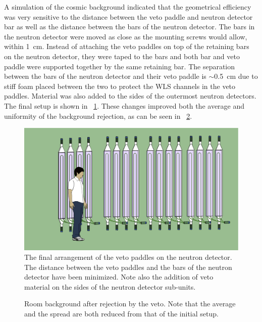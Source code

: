 A simulation of the cosmic background indicated that the geometrical efficiency was very sensitive to the distance between the veto paddle and neutron detector bar as well as the distance between the bars of the neutron detector.   The bars in the neutron detector were moved as close as the mounting screws would allow, within 1~cm.  Instead of attaching the veto paddles on top of the retaining bars on the neutron detector, they were taped to the bars and both bar and veto paddle were supported together by the same retaining bar.  The separation between the bars of the neutron detector and their veto paddle is $\sim$0.5~cm due to stiff foam placed between the two to protect the WLS channels in the veto paddles.  Material was also added to the sides of the outermost neutron detectors.  The final setup is shown in {\fig}~\ref{fig:vetoSetup}.  These changes improved both the average and uniformity of the background rejection, as can be seen in {\fig}~\ref{fig:finalBackground}.
\begin{figure}[htp]
\centering
\includegraphics[width=1.0\textwidth]{figures/neutwall_Oct18.eps}
\caption{The final arrangement of the veto paddles on the neutron detector.  The distance between the veto paddles and the bars of the neutron detector have been minimized.  Note also the addition of veto material on the sides of the neutron detector sub-units.}
\label{fig:vetoSetup}
\end{figure}

\begin{figure}[htp]
\vspace{3in}
\caption{Room background after rejection by the veto.  Note that the average and the spread are both reduced from that of the initial setup.}
\label{fig:finalBackground}
\end{figure}

